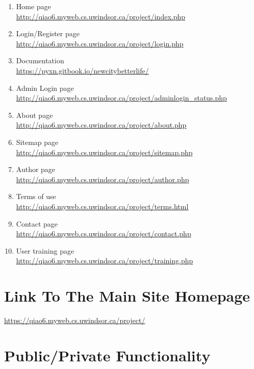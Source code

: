 \documentclass[12pt, letterpaper]{article}
\begin{document}
\begin{enumerate}
	\item Home page 			\\\url{http://qiao6.myweb.cs.uwindsor.ca/project/index.php}
	\item Login/Register page 	\\\url{http://qiao6.myweb.cs.uwindsor.ca/project/login.php}
	\item Documentation 		\\\url{https://pyxn.gitbook.io/newcitybetterlife/}
	\item Admin Login page 		\\\url{http://qiao6.myweb.cs.uwindsor.ca/project/adminlogin_status.php}
	\item About page 			\\\url{http://qiao6.myweb.cs.uwindsor.ca/project/about.php}
	\item Sitemap page 			\\\url{http://qiao6.myweb.cs.uwindsor.ca/project/sitemap.php}
	\item Author page 			\\\url{http://qiao6.myweb.cs.uwindsor.ca/project/author.php}
	\item Terms of use 			\\\url{http://qiao6.myweb.cs.uwindsor.ca/project/terms.html}
	\item Contact page 			\\\url{http://qiao6.myweb.cs.uwindsor.ca/project/contact.php}
	\item User training page 	\\\url{http://qiao6.myweb.cs.uwindsor.ca/project/training.php}
\end{enumerate}

\section{Link To The Main Site Homepage}
\url{https://qiao6.myweb.cs.uwindsor.ca/project/}

\section{Public/Private Functionality}
\end{document}
